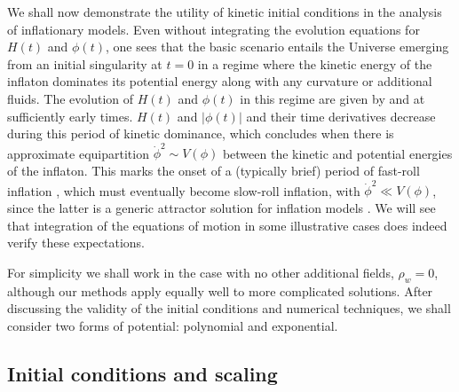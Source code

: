 We shall now demonstrate the utility of kinetic initial conditions in
the analysis of inflationary models. Even without integrating the
evolution equations for $H(t)$ and $\phi(t)$, one sees that the basic
scenario entails the Universe emerging from an initial singularity at
$t=0$ in a regime where the kinetic energy of the inflaton dominates
its potential energy along with any curvature or additional fluids.
The evolution of $H(t)$ and $\phi(t)$ in this regime are given by
 and  at sufficiently
early times.  $H(t)$ and $|\phi(t)|$ and their time derivatives
decrease during this period of kinetic dominance, which concludes when
there is approximate equipartition $\dot{\phi}^2 \sim V(\phi)$ between
the kinetic and potential energies of the inflaton.  This marks the
onset of a (typically brief) period of fast-roll inflation
\citep{Linde:2001}, which must eventually become slow-roll inflation,
with $\dot{\phi}^2 \ll V(\phi)$, since the latter is a generic
attractor solution for inflation models
\citep{belinsky_inflationary_1985}.  We will see that integration of
the equations of motion in some illustrative cases does indeed verify
these expectations.

For simplicity we shall work in the case with no other additional
fields, $\rho_w=0$, although our methods apply equally well to more
complicated solutions. After discussing the validity of the initial
conditions and numerical techniques, we shall consider two forms of
potential: polynomial and exponential.

\subsection{Initial conditions and scaling}

